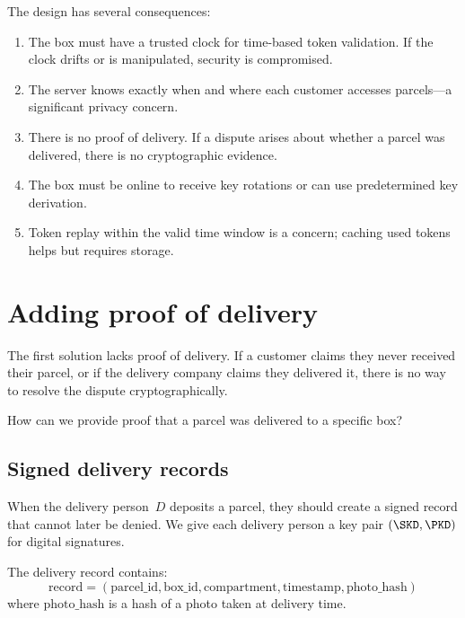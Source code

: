The design has several consequences:
\begin{enumerate}
  \item The box must have a trusted clock for time-based token validation.
    If the clock drifts or is manipulated, security is compromised.
  \item The server knows exactly when and where each customer accesses
    parcels---a significant privacy concern.
  \item There is no proof of delivery.
    If a dispute arises about whether a parcel was delivered, there is no
    cryptographic evidence.
  \item The box must be online to receive key rotations or can use
    predetermined key derivation.
  \item Token replay within the valid time window is a concern; caching
    used tokens helps but requires storage.
\end{enumerate}


\section{Adding proof of delivery}\label{ProofOfDelivery}


The first solution lacks proof of delivery.
If a customer claims they never received their parcel, or if the delivery
company claims they delivered it, there is no way to resolve the dispute
cryptographically.

\begin{exercise}
  How can we provide proof that a parcel was delivered to a specific box?
\end{exercise}

\subsection{Signed delivery records}

When the delivery person~\(D\) deposits a parcel, they should create a
signed record that cannot later be denied.
We give each delivery person a key pair \((\SKD, \PKD)\) for digital
signatures.

The delivery record contains:
\[
  \text{record} = (\text{parcel\_id}, \text{box\_id}, \text{compartment},
  \text{timestamp}, \text{photo\_hash})
\]
where \(\text{photo\_hash}\) is a hash of a photo taken at delivery time.

